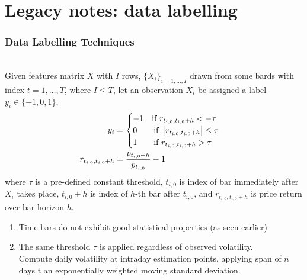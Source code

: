 \documentclass[a4paper,oneside,openany]{book}
\begin{document}
\chapter*{Legacy notes: data labelling}

\subsection*{Data Labelling Techniques}

\begin{method} \\
Given features matrix $X$ with $I$ rows, $\{X_i\}_{i = 1, \ldots, I}$ drawn from some bards with index $t = 1, \ldots, T$, where $I \leq T$, let an observation $X_i$ be assigned a label $y_i \in \{-1, 0, 1\}$,
\begin{align*}
y_i &=
\begin{cases}
-1 \ \ \ \text{if } r_{t_{i,0}, t_{i,0} + h} < -\tau \\
0 \ \ \ \ \ \ \text{if } \left\lvert r_{t_{i,0}, t_{i,0} + h}\right\rvert \leq \tau \\
1 \ \ \ \ \ \ \text{if } r_{t_{i,0}, t_{i,0} + h} > \tau
\end{cases} \nonumber \\
r_{t_{i,0}, t_{i,0} + h} &= \frac{p_{t_{i,0}+h}}{p_{t_{i,0}}} - 1 \nonumber
\end{align*}
where $\tau$ is a pre-defined constant threshold, $t_{i,0}$ is index of bar immediately after $X_i$ takes place, $t_{i,0} + h$ is index of $h$-th bar after $t_{i,0}$, and $r_{t_{i,0}, t_{i,0} + h}$ is price return over bar horizon $h$.
\end{method}

\begin{remark} 
\begin{enumerate}[label=\roman*.]
\setlength{\itemsep}{0pt}
\item Time bars do not exhibit good statistical properties (as seen earlier)
\item The same threshold $\tau$ is applied regardless of observed volatility.\\
Compute daily volatility at intraday estimation points, applying span of $n$ days t an exponentially weighted moving standard deviation.
\end{enumerate}
\end{remark}
\end{document}
